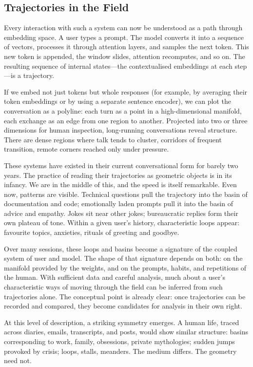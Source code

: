 \subsection*{Trajectories in the Field}

Every interaction with such a system can now be understood as a path through embedding space. A user types a prompt. The model converts it into a sequence of vectors, processes it through attention layers, and samples the next token. This new token is appended, the window slides, attention recomputes, and so on. The resulting sequence of internal states---the contextualised embeddings at each step---is a trajectory.

If we embed not just tokens but whole responses (for example, by averaging their token embeddings or by using a separate sentence encoder), we can plot the conversation as a polyline: each turn as a point in a high-dimensional manifold, each exchange as an edge from one region to another. Projected into two or three dimensions for human inspection, long-running conversations reveal structure. There are dense regions where talk tends to cluster, corridors of frequent transition, remote corners reached only under pressure.

These systems have existed in their current conversational form for barely two years. The practice of reading their trajectories as geometric objects is in its infancy. We are in the middle of this, and the speed is itself remarkable. Even now, patterns are visible. Technical questions pull the trajectory into the basin of documentation and code; emotionally laden prompts pull it into the basin of advice and empathy. Jokes sit near other jokes; bureaucratic replies form their own plateau of tone. Within a given user's history, characteristic loops appear: favourite topics, anxieties, rituals of greeting and goodbye.

Over many sessions, these loops and basins become a signature of the coupled system of user and model. The shape of that signature depends on both: on the manifold provided by the weights, and on the prompts, habits, and repetitions of the human. With sufficient data and careful analysis, much about a user's characteristic ways of moving through the field can be inferred from such trajectories alone. The conceptual point is already clear: once trajectories can be recorded and compared, they become candidates for analysis in their own right.

At this level of description, a striking symmetry emerges. A human life, traced across diaries, emails, transcripts, and posts, would show similar structure: basins corresponding to work, family, obsessions, private mythologies; sudden jumps provoked by crisis; loops, stalls, meanders. The medium differs. The geometry need not.

